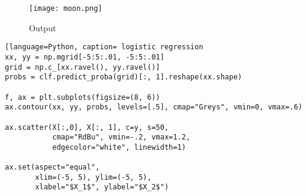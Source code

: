 \documentclass[onecolumn]{article}
\begin{document}
\begin{figure}[ht!]
\centering
\texttt{[image: moon.png]}
\caption{Output \label{}}
\end{figure}

\begin{lstlisting}[language=Python, caption= logistic regression 
xx, yy = np.mgrid[-5:5:.01, -5:5:.01]
grid = np.c_[xx.ravel(), yy.ravel()]
probs = clf.predict_proba(grid)[:, 1].reshape(xx.shape)

f, ax = plt.subplots(figsize=(8, 6))
ax.contour(xx, yy, probs, levels=[.5], cmap="Greys", vmin=0, vmax=.6)

ax.scatter(X[:,0], X[:, 1], c=y, s=50,
           cmap="RdBu", vmin=-.2, vmax=1.2,
           edgecolor="white", linewidth=1)

ax.set(aspect="equal",
       xlim=(-5, 5), ylim=(-5, 5),
       xlabel="$X_1$", ylabel="$X_2$")

\end{lstlisting} 





 
\nocite{*}


\end{document}
